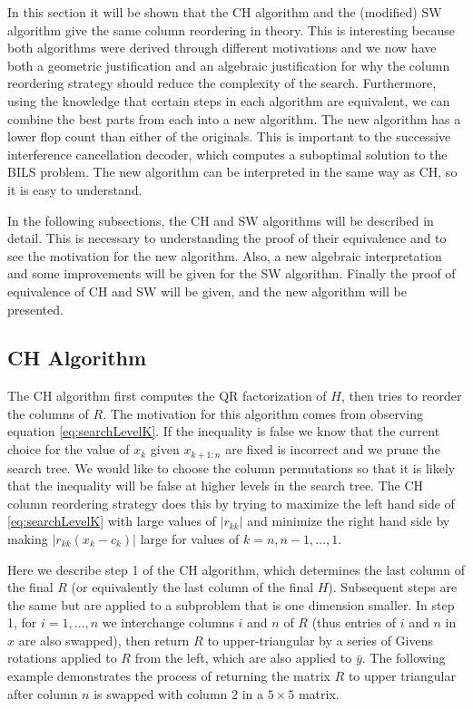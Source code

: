 \documentclass[12pt,Bold,letterpaper]{mcgilletdclass}
\begin{document}
In this section it will be shown that the CH algorithm and the  (modified)  SW algorithm give the same
column reordering in theory. This is interesting because both algorithms were derived through different motivations
and we now have both a geometric justification and an algebraic justification 
for why the column reordering strategy should reduce the complexity of the search.
Furthermore, using the knowledge that certain steps in each algorithm are equivalent,
we can combine the best parts from each into a new algorithm. The new algorithm
has a lower flop count than either of the originals.
This is important to the successive interference cancellation decoder, 
which computes a suboptimal solution to the BILS problem.
The new algorithm can be interpreted in the same way as CH,
so it is easy to understand. 

In the following subsections, the CH and SW algorithms will be described in detail. This is necessary to understanding the proof of their equivalence and to see the motivation for the new algorithm. Also, a new algebraic interpretation and some improvements will be given for the SW algorithm. Finally the proof of equivalence of CH and SW will be given, and the new algorithm will be presented.

\subsection{CH Algorithm}
The CH algorithm first computes the QR factorization of $H$,
then  tries to reorder the columns of $R$.
The motivation for this algorithm comes from observing equation \eqref{eq:searchLevelK}.
If the inequality is false we know that the current choice for the value of
$x_k$ given $x_{k+1:n}$ are fixed is incorrect and we prune the search tree. We
would like to choose the column permutations so that it is likely that the
inequality will be false at higher levels in the search tree. The CH column reordering strategy
does this by trying to maximize the left hand side of  \eqref{eq:searchLevelK} with large values of $\left | r_{kk}
\right |$ and minimize the right hand side by making $\left | r_{kk}(x_k-c_k) \right |$
large for values of $k = n,n-1, \dots, 1$.

Here we describe  step 1 of the CH algorithm, which determines the last column of the final $R$ 
(or equivalently the last column of the final $H$).
Subsequent steps are the same but are applied to a subproblem that is one dimension smaller. 
In step 1, for $i = 1,\dots,n$ we interchange
columns $i$ and $n$ of  $R$ (thus entries of $i$ and $n$ in $x$ are also swapped), then return $R$ to upper-triangular
by a series of Givens rotations applied to $R$ from the left, which  are also applied to $\bar{y}$. The following example demonstrates the process of returning the matrix $R$ to upper triangular after column $n$ is swapped with column $2$ in a $5 \times 5$ matrix.
\end{document}
